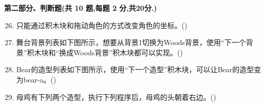 \documentclass[10pt, a4paper]{article}
\begin{document}
    \newpage
    {\noindent\textbf{第二部分、判断题(共 10 题,每题 2 分,共20分.)}}
    \begin{enumerate}
        \setcounter{enumi}{25}
        \item 只能通过积木块和拖动角色的方式改变角色的坐标。(\qquad)

        \item 舞台背景列表如下图所示，想要从背景1切换为Woods背景，使用“下一个背景”积木块和“换成Woods背景”积木块都可以实现。(\qquad)

        \item Bear的造型列表如下图所示，使用“下一个造型”积木块，可以让Bear的造型变为bear-a。(\qquad)

        \item 母鸡有下列两个造型，执行下列程序后，母鸡的头朝着右边。(\qquad)


\end{enumerate}
\end{document}
